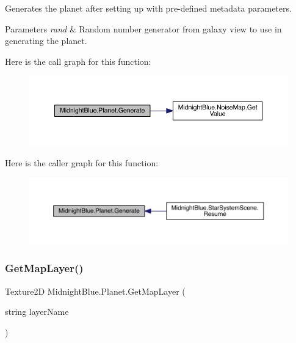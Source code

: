 Generates the planet after setting up with pre-\/defined metadata parameters. 


\begin{DoxyParams}{Parameters}
{\em rand} & Random number generator from galaxy view to use in generating the planet.\\
\hline
\end{DoxyParams}
Here is the call graph for this function\+:\nopagebreak
\begin{figure}[H]
\begin{center}
\leavevmode
\includegraphics[width=350pt]{class_midnight_blue_1_1_planet_ac7264aea3a992afb4cab0ad99c96dbb8_cgraph}
\end{center}
\end{figure}
Here is the caller graph for this function\+:\nopagebreak
\begin{figure}[H]
\begin{center}
\leavevmode
\includegraphics[width=350pt]{class_midnight_blue_1_1_planet_ac7264aea3a992afb4cab0ad99c96dbb8_icgraph}
\end{center}
\end{figure}
\hypertarget{class_midnight_blue_1_1_planet_ac3b3442ad8f168a8d9151386592eb270}{}\label{class_midnight_blue_1_1_planet_ac3b3442ad8f168a8d9151386592eb270} 
\subsubsection{\texorpdfstring{Get\+Map\+Layer()}{GetMapLayer()}}
{\footnotesize\ttfamily Texture2D Midnight\+Blue.\+Planet.\+Get\+Map\+Layer (\begin{DoxyParamCaption}\item[{string}]{layer\+Name }\end{DoxyParamCaption})\hspace{0.3cm}{\ttfamily [inline]}}



